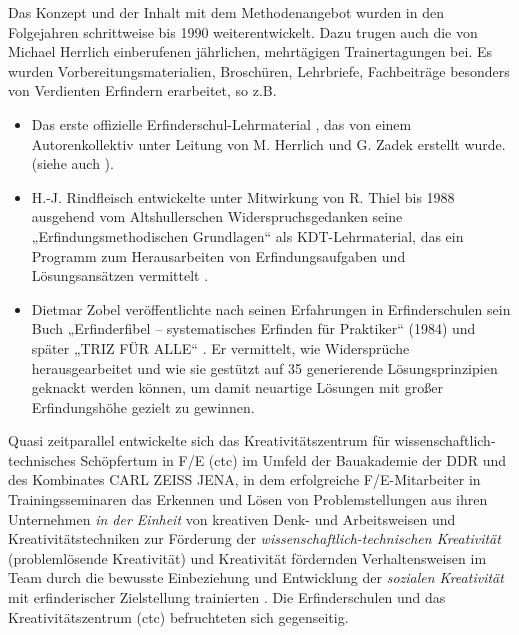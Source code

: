 \documentclass[11pt,a4paper]{article}
\begin{document}
Das Konzept und der Inhalt mit dem Methodenangebot wurden in den Folgejahren
schrittweise bis 1990 weiterentwickelt. Dazu trugen auch die von Michael
Herrlich einberufenen jährlichen, mehrtägigen Trainertagungen bei. Es wurden
Vorbereitungsmaterialien, Broschü\-ren, Lehrbriefe, Fachbeiträge besonders von
Verdienten Erfindern erarbeitet, so z.B.
\begin{itemize}
\item Das erste offizielle Erfinderschul-Lehrmaterial \cite{7}, das von einem
  Autorenkollektiv unter Leitung von M. Herrlich und G. Zadek erstellt wurde.
  (siehe auch \cite{19}).
\item H.-J. Rindfleisch entwickelte unter Mitwirkung von R. Thiel bis 1988
  ausgehend vom Altshullerschen Widerspruchsgedanken seine
  „Erfindungsmethodischen Grundlagen“ als KDT-Lehrmaterial, das ein Programm
  zum Herausarbeiten von Erfindungsaufgaben und Lösungsansätzen vermittelt
  \cite{8}.
\item Dietmar Zobel veröffentlichte nach seinen Erfahrungen in Erfinderschulen
  sein Buch „Erfinderfibel – systematisches Erfinden für Praktiker“ \cite{9.1}
  (1984) und später „TRIZ FÜR ALLE“ \cite{9.3}. Er vermittelt, wie
  Widersprüche herausgearbeitet und wie sie gestützt auf 35 generierende
  Lösungsprinzipien geknackt werden können, um damit neuartige Lösungen mit
  großer Erfindungshöhe gezielt zu gewinnen.
\end{itemize}
Quasi zeitparallel entwickelte sich das Kreativitätszentrum für
wissenschaftlich-technisches Schöpfertum in F/E (ctc) im Umfeld der
Bauakademie der DDR und des Kombinates CARL ZEISS JENA, in dem erfolgreiche
F/E-Mitarbeiter in Trainingsseminaren das Erkennen und Lösen von
Problemstellungen aus ihren Unternehmen \emph{in der Einheit} von kreativen
Denk- und Arbeitsweisen und Kreativitätstechniken zur Förderung der
\emph{wissenschaftlich-technischen Kreativität} (problemlösende Kreativität)
und Kreativität fördernden Verhaltensweisen im Team durch die bewusste
Einbeziehung und Entwicklung der \emph{sozialen Kreativität} mit
erfinderischer Zielstellung trainierten \cite{10,11}. Die Erfinderschulen und
das Kreativitätszentrum (ctc) befruchteten sich gegenseitig.
    
\end{document}
